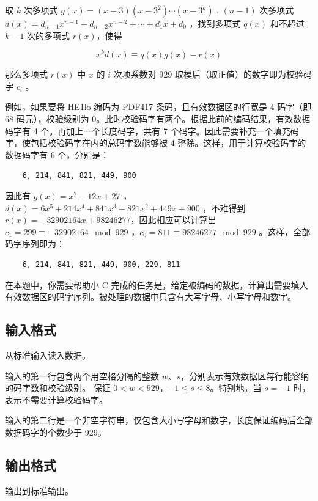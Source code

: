取 $k$ 次多项式 $g(x)=(x-3)(x-3^2)\cdots(x-3^k)$
, $(n-1)$ 次多项式 $d(x)=d_{n-1}x^{n-1}+d_{n-2}x^{n-2}+\cdots+d_1x+d_0$
，找到多项式 $q(x)$ 和不超过 $k-1$ 次的多项式 $r(x)$，使得

\begin{equation*}
    x^kd(x)\equiv q(x)g(x)-r(x)
\end{equation*}

那么多项式 $r(x)$ 中 $x$ 的 $i$ 次项系数对 929 取模后（取正值）的数字即为校验码字 $c_i$
。

例如，如果要将 HE1lo 编码为 PDF417 条码，且有效数据区的行宽是 4 码字（即 68 码元），校验级别为 0。此时校验码字有两个。根据此前的编码结果，有效数据码字有 4 个。再加上一个长度码字，共有 7 个码字。因此需要补充一个填充码字，使包括校验码字在内的总码字数能够被 4 整除。这样，用于计算校验码字的数据码字有 6 个，分别是：

\begin{lstlisting}
    6, 214, 841, 821, 449, 900
\end{lstlisting}

因此有 $g(x)=x^2-12x+27$
，$d(x)=6x^5+214x^4+841x^3+821x^2+449x+900$
，不难得到 $r(x)=-32902164x+98246277$，因此相应可以计算出 $c_1=299\equiv -32902164\mod 929$
，$c_0=811\equiv 98246277\mod 929$
。这样，全部码字序列即为：

\begin{lstlisting}
    6, 214, 841, 821, 449, 900, 229, 811
\end{lstlisting}

在本题中，你需要帮助小 C 完成的任务是，给定被编码的数据，计算出需要填入有效数据区的码字序列。被处理的数据中只含有大写字母、小写字母和数字。

\subsection*{输入格式}

从标准输入读入数据。

输入的第一行包含两个用空格分隔的整数 $w$、$s$，分别表示有效数据区每行能容纳的码字数和校验级别。
保证 $0<w<929$，$-1\le s\le 8$。特别地，当 $s=-1$ 时，表示不需要计算校验码字。

输入的第二行是一个非空字符串，仅包含大小写字母和数字，长度保证编码后全部数据码字的个数少于 929。

\subsection*{输出格式}

输出到标准输出。

